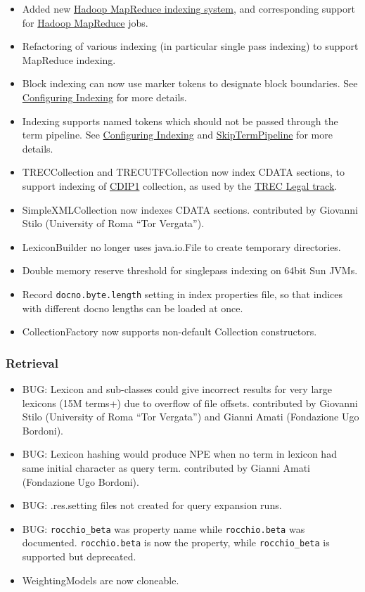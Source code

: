 \begin{itemize}
\tightlist
\item
  Added new \href{hadoop_indexing.html}{Hadoop MapReduce indexing
  system}, and corresponding support for
  \href{hadoop_configuration.html}{Hadoop MapReduce} jobs.
\item
  Refactoring of various indexing (in particular single pass indexing)
  to support MapReduce indexing.
\item
  Block indexing can now use marker tokens to designate block
  boundaries. See \href{configure_indexing.html}{Configuring Indexing}
  for more details.
\item
  Indexing supports named tokens which should not be passed through the
  term pipeline. See \href{configure_indexing.html}{Configuring
  Indexing} and
  \href{javadoc/org/terrier/terms/SkipTermPipeline.html}{SkipTermPipeline}
  for more details.
\item
  TRECCollection and TRECUTFCollection now index CDATA sections, to
  support indexing of
  \href{http://www.ir.iit.edu/projects/CDIP.html}{CDIP1} collection, as
  used by the \href{http://trec-legal.umiacs.umd.edu/}{TREC Legal
  track}.
\item
  SimpleXMLCollection now indexes CDATA sections. contributed by
  Giovanni Stilo (University of Roma ``Tor Vergata'').
\item
  LexiconBuilder no longer uses java.io.File to create temporary
  directories.
\item
  Double memory reserve threshold for singlepass indexing on 64bit Sun
  JVMs.
\item
  Record \texttt{docno.byte.length} setting in index properties file, so
  that indices with different docno lengths can be loaded at once.
\item
  CollectionFactory now supports non-default Collection constructors.
\end{itemize}

\subsubsection{Retrieval}\label{retrieval-5}

\begin{itemize}
\tightlist
\item
  BUG: Lexicon and sub-classes could give incorrect results for very
  large lexicons (15M terms+) due to overflow of file offsets.
  contributed by Giovanni Stilo (University of Roma ``Tor Vergata'') and
  Gianni Amati (Fondazione Ugo Bordoni).
\item
  BUG: Lexicon hashing would produce NPE when no term in lexicon had
  same initial character as query term. contributed by Gianni Amati
  (Fondazione Ugo Bordoni).
\item
  BUG: .res.setting files not created for query expansion runs.
\item
  BUG: \texttt{rocchio\_beta} was property name while
  \texttt{rocchio.beta} was documented. \texttt{rocchio.beta} is now the
  property, while \texttt{rocchio\_beta} is supported but deprecated.
\item
  WeightingModels are now cloneable.
\end{itemize}

